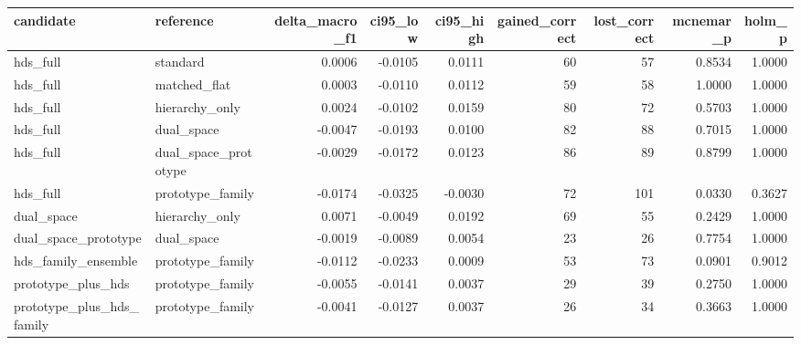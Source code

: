 \begin{tabular}{llrrrrrrr}
\toprule
candidate & reference & delta\_macro\_f1 & ci95\_low & ci95\_high & gained\_correct & lost\_correct & mcnemar\_p & holm\_p \\
\midrule
hds\_full & standard & 0.0006 & -0.0105 & 0.0111 & 60 & 57 & 0.8534 & 1.0000 \\
hds\_full & matched\_flat & 0.0003 & -0.0110 & 0.0112 & 59 & 58 & 1.0000 & 1.0000 \\
hds\_full & hierarchy\_only & 0.0024 & -0.0102 & 0.0159 & 80 & 72 & 0.5703 & 1.0000 \\
hds\_full & dual\_space & -0.0047 & -0.0193 & 0.0100 & 82 & 88 & 0.7015 & 1.0000 \\
hds\_full & dual\_space\_prototype & -0.0029 & -0.0172 & 0.0123 & 86 & 89 & 0.8799 & 1.0000 \\
hds\_full & prototype\_family & -0.0174 & -0.0325 & -0.0030 & 72 & 101 & 0.0330 & 0.3627 \\
dual\_space & hierarchy\_only & 0.0071 & -0.0049 & 0.0192 & 69 & 55 & 0.2429 & 1.0000 \\
dual\_space\_prototype & dual\_space & -0.0019 & -0.0089 & 0.0054 & 23 & 26 & 0.7754 & 1.0000 \\
hds\_family\_ensemble & prototype\_family & -0.0112 & -0.0233 & 0.0009 & 53 & 73 & 0.0901 & 0.9012 \\
prototype\_plus\_hds & prototype\_family & -0.0055 & -0.0141 & 0.0037 & 29 & 39 & 0.2750 & 1.0000 \\
prototype\_plus\_hds\_family & prototype\_family & -0.0041 & -0.0127 & 0.0037 & 26 & 34 & 0.3663 & 1.0000 \\
\bottomrule
\end{tabular}
